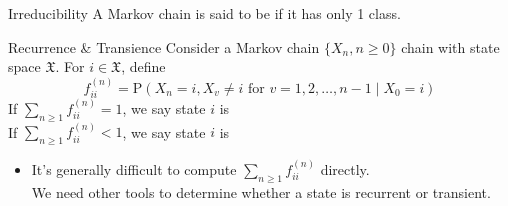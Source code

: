 \documentclass[letterpaper, mathserif]{beamer}
\def\P{\mathbb{P}}
\def\p{\mathrm P}
\def\X{\mathfrak{X}}
\begin{document}
%
\begin{frame}{Irreducibility}
A Markov chain is said to be  if it has only 1 class.
\end{frame}
\begin{frame}{Recurrence \& Transience}
Consider a Markov chain $\{X_n, n\ge 0\}$ chain with state space $\X$.
For $i\in\X$, define $$f^{(n)}_{ii}=\p(X_n=i, X_v \neq i \text{ for }v = 1,2,\ldots, n-1 \mid X_0=i)$$
If $\sum_{n \geq 1} f^{(n)}_{ii}=1$, we say state $i$ is \\
If $\sum_{n \geq 1} f^{(n)}_{ii} < 1$, we say state $i$ is 
\begin{itemize}
\item It's generally difficult to compute $\sum_{n \geq 1} f^{(n)}_{ii}$ directly.\\
We need other tools to determine whether a state is recurrent or transient.
\end{itemize}
\end{frame}
\end{document}
